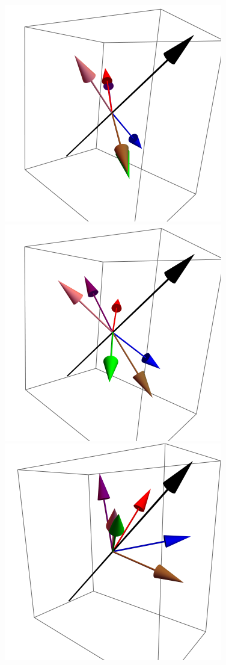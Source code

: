 \documentclass{article}
\begin{document}
\begin{figure}[ht]
\includegraphics[scale=0.29]{HVariedData/Pictures/101Inc116.png}
\includegraphics[scale=0.29]{HVariedData/Pictures/101Inc128.png}
\includegraphics[scale=0.29]{HVariedData/Pictures/101Inc32S.png}

\end{figure}
\end{document}
